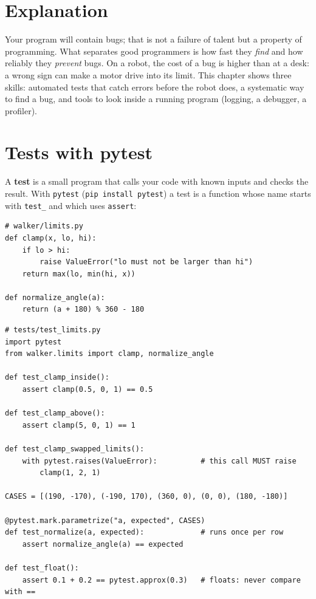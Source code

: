 \label{ch:py11}

\section*{Explanation}
Your program will contain bugs; that is not a failure of talent but a property of programming. What separates good programmers is how fast they \emph{find} and how reliably they \emph{prevent} bugs. On a robot, the cost of a bug is higher than at a desk: a wrong sign can make a motor drive into its limit. This chapter shows three skills: automated tests that catch errors before the robot does, a systematic way to find a bug, and tools to look inside a running program (logging, a debugger, a profiler).

\section*{Tests with pytest}
A \textbf{test} is a small program that calls your code with known inputs and checks the result. With \texttt{pytest} (\verb!pip install pytest!) a test is a function whose name starts with \texttt{test\_} and which uses \texttt{assert}:
\begin{verbatim}
# walker/limits.py
def clamp(x, lo, hi):
    if lo > hi:
        raise ValueError("lo must not be larger than hi")
    return max(lo, min(hi, x))

def normalize_angle(a):
    return (a + 180) % 360 - 180
\end{verbatim}
\begin{verbatim}
# tests/test_limits.py
import pytest
from walker.limits import clamp, normalize_angle

def test_clamp_inside():
    assert clamp(0.5, 0, 1) == 0.5

def test_clamp_above():
    assert clamp(5, 0, 1) == 1

def test_clamp_swapped_limits():
    with pytest.raises(ValueError):          # this call MUST raise
        clamp(1, 2, 1)

CASES = [(190, -170), (-190, 170), (360, 0), (0, 0), (180, -180)]

@pytest.mark.parametrize("a, expected", CASES)
def test_normalize(a, expected):             # runs once per row
    assert normalize_angle(a) == expected

def test_float():
    assert 0.1 + 0.2 == pytest.approx(0.3)   # floats: never compare with ==
\end{verbatim}
